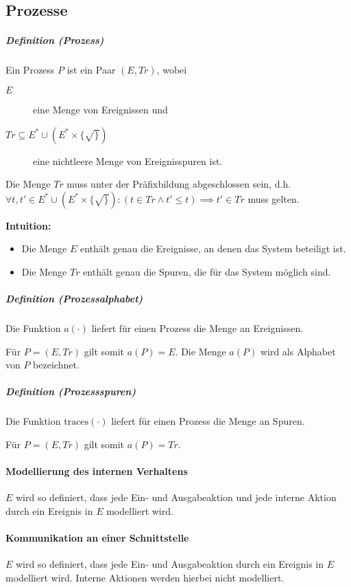 \documentclass[a4paper, 11pt, accentcolor = tud3b]{tudreport}
\newcommand{\subsubparagraph}[1]{\hspace{1cm} \textbf{#1:}}
\newcommand{\definition}[2]{\subparagraph{Definition (#1)} #2}
\newcommand{\intuition}[1]{\subsubparagraph{Intuition} #1}
\begin{document}
		    \subsection{Prozesse}
			    \definition{Prozess}{
			    	Ein Prozess $ P $ ist ein Paar $ (E, \textit{Tr}) $, wobei
			    	\begin{description}
			    		\item[$ E $] eine Menge von Ereignissen und
			    		\item[$ \textit{Tr} \subseteq E ^ * \cup (E ^ * \times \{ \surd \}) $] eine nichtleere Menge von Ereignisspuren ist.
			    	\end{description}
			    	Die Menge $ Tr $ muss unter der Präfixbildung abgeschlossen sein, d.h. $ \forall t, t' \in  E ^ * \cup (E ^ * \times \{ \surd \}) : (t \in \textit{Tr} \land t' \leq t) \implies t' \in \textit{Tr} $ muss gelten.
			    	
			    	\intuition{
			    		\begin{itemize}
			    			\item Die Menge $ E $ enthält genau die Ereignisse, an denen das System beteiligt ist.
			    			\item Die Menge $ \textit{Tr} $ enthält genau die Spuren, die für das System möglich sind.
			    		\end{itemize}
			    	}
			    }
			    
			    \definition{Prozessalphabet}{
			    	Die Funktion $ a(\cdot) $ liefert für einen Prozess die Menge an Ereignissen.
			    	
			    	Für $ P = (E, \textit{Tr}) $ gilt somit $ a(P) = E $. Die Menge $ a(P) $ wird als Alphabet von $ P $ bezeichnet.
			    }
			    
			    \definition{Prozessspuren}{
			    	Die Funktion $ \text{traces}(\cdot) $ liefert für einen Prozess die Menge an Spuren.
			    	
			    	Für $ P = (E, \textit{Tr}) $ gilt somit $ a(P) = \textit{Tr} $.
			    }
			    
			    \paragraph{Modellierung des internen Verhaltens}
				    $ E $ wird so definiert, dass jede Ein- und Ausgabeaktion und jede interne Aktion durch ein Ereignis in $ E $ modelliert wird.
			    
			    \paragraph{Kommunikation an einer Schnittstelle}
				    $ E $ wird so definiert, dass jede Ein- und Ausgabeaktion durch ein Ereignis in $ E $ modelliert wird. Interne Aktionen werden hierbei nicht modelliert.
		    
\end{document}
